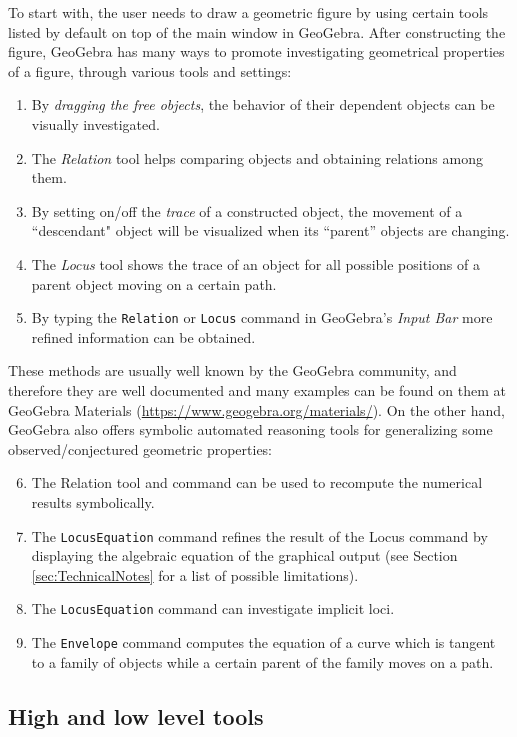 \documentclass{article}
\begin{document}
To start with,  the user needs to draw a geometric figure by using certain tools listed by default on top of the main window in GeoGebra. After constructing the figure, GeoGebra has many ways to promote investigating geometrical properties of a figure,  through various tools and settings:
\begin{enumerate}
    \item By \textit{dragging the free objects}, the behavior of their dependent objects can be visually investigated.
    \item The \textit{Relation} tool helps comparing objects and obtaining relations among them.
    \item By setting on/off the \textit{trace} of a constructed object,  the movement of a ``descendant" object will be visualized when its ``parent'' objects are changing.
    \item The \textit{Locus} tool shows the trace of an object for all possible positions of a parent object moving on a certain path.
    \item By typing the \texttt{Relation} or \texttt{Locus} command in GeoGebra's \textit{Input Bar} more refined information can be obtained.
\end{enumerate}
These methods are usually well known by the GeoGebra community, and therefore they are well documented and many examples can be found on them at GeoGebra Materials (\url{https://www.geogebra.org/materials/}). On the other hand, GeoGebra also offers symbolic automated reasoning tools for generalizing some observed/conjectured geometric properties:
\begin{enumerate}
\setcounter{enumi}{5}
    \item The Relation tool and command can be used to recompute the numerical results symbolically.
    \item The \texttt{LocusEquation} command refines the result of the Locus command by displaying the algebraic equation of the graphical output (see Section \ref{sec:TechnicalNotes} for a list of possible
limitations).
    \item The \texttt{LocusEquation} command can investigate implicit loci.
    \item The \texttt{Envelope} command computes the equation of a curve which is tangent to a family of objects while a certain parent of the family moves on a path.
\end{enumerate}

\subsection{High and low level tools}
\end{document}
